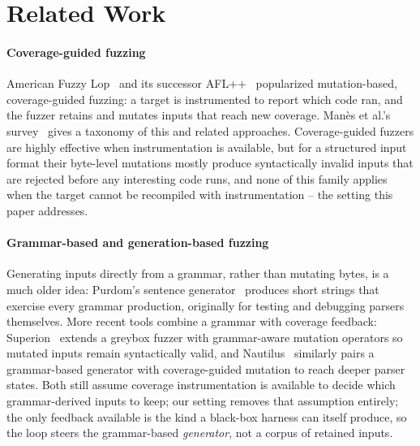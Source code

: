 \section{Related Work}
\label{sec:related-work}

\paragraph{Coverage-guided fuzzing}
American Fuzzy Lop~\cite{zalewski2014afl} and its successor AFL++~\cite{fioraldi2020aflplusplus}
popularized mutation-based, coverage-guided fuzzing: a target is
instrumented to report which code ran, and the fuzzer retains and mutates
inputs that reach new coverage. Man\`es et al.'s survey~\cite{manes2021fuzzing}
gives a taxonomy of this and related approaches. Coverage-guided fuzzers are
highly effective when instrumentation is available, but for a structured
input format their byte-level mutations mostly produce syntactically invalid
inputs that are rejected before any interesting code runs, and none of this
family applies when the target cannot be recompiled with instrumentation --
the setting this paper addresses.

\paragraph{Grammar-based and generation-based fuzzing}
Generating inputs directly from a grammar, rather than mutating bytes, is a
much older idea: Purdom's sentence generator~\cite{purdom1972sentence}
produces short strings that exercise every grammar production, originally
for testing and debugging parsers themselves. More recent tools combine a
grammar with coverage feedback: Superion~\cite{wang2019superion} extends a
greybox fuzzer with grammar-aware mutation operators so mutated inputs
remain syntactically valid, and Nautilus~\cite{aschermann2019nautilus}
similarly pairs a grammar-based generator with coverage-guided mutation to
reach deeper parser states. Both still assume coverage instrumentation is
available to decide which grammar-derived inputs to keep; our setting
removes that assumption entirely; the only feedback available is the kind a
black-box harness can itself produce, so the loop steers the grammar-based
\emph{generator}, not a corpus of retained inputs.

